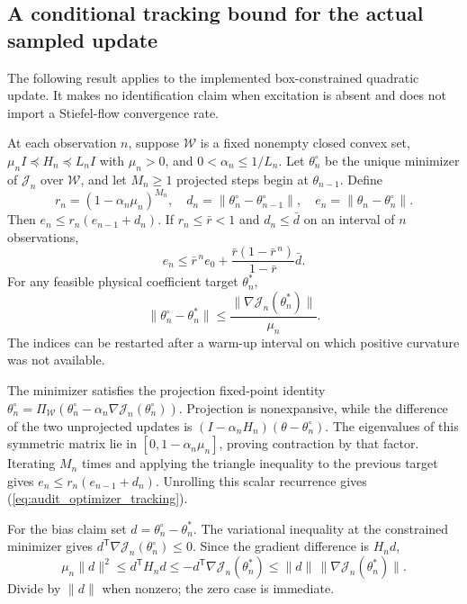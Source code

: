 \subsection{A conditional tracking bound for the actual sampled update}
The following result applies to the implemented box-constrained quadratic
update. It makes no identification claim when excitation is absent and
does not import a Stiefel-flow convergence rate.

\begin{auditproposition}
\label{prop:audit_tracking}
At each observation $n$, suppose $\mathcal W$ is a fixed nonempty closed
convex set, $\mu_n I\preceq H_n\preceq L_nI$ with $\mu_n>0$, and
$0<\alpha_n\le1/L_n$. Let $\theta_n^\circ$ be the unique minimizer
of $\mathcal J_n$ over $\mathcal W$, and let $M_n\ge1$ projected steps begin
at $\theta_{n-1}$. Define
\begin{equation}
 r_n=(1-\alpha_n\mu_n)^{M_n},\quad
 d_n=\|\theta_n^\circ-\theta_{n-1}^\circ\|,\quad
 e_n=\|\theta_n-\theta_n^\circ\|.
\end{equation}
Then $e_n\le r_n(e_{n-1}+d_n)$. If $r_n\le\bar r<1$ and
$d_n\le\bar d$ on an interval of $n$ observations,
\begin{equation}
 e_n\le\bar r^{\,n}e_0+
       \frac{\bar r(1-\bar r^{\,n})}{1-\bar r}\bar d.
 \label{eq:audit_optimizer_tracking}
\end{equation}
For any feasible physical coefficient target $\theta_n^*$,
\begin{equation}
 \|\theta_n^\circ-\theta_n^*\|
 \le\frac{\|\nabla\mathcal J_n(\theta_n^*)\|}{\mu_n}.
 \label{eq:audit_physical_bias}
\end{equation}
The indices can be restarted after a warm-up interval on which positive
curvature was not available.
\end{auditproposition}
\begin{IEEEproof}
The minimizer satisfies the projection fixed-point identity
$\theta_n^\circ=\Pi_{\mathcal W}(\theta_n^\circ-
\alpha_n\nabla\mathcal J_n(\theta_n^\circ))$.
Projection is nonexpansive, while the difference of the two unprojected
updates is $(I-\alpha_nH_n)(\theta-\theta_n^\circ)$.
The eigenvalues of this symmetric matrix lie in
$[0,1-\alpha_n\mu_n]$, proving contraction by that factor. Iterating
$M_n$ times and applying the triangle inequality to the previous target
gives $e_n\le r_n(e_{n-1}+d_n)$. Unrolling this scalar recurrence
gives (\ref{eq:audit_optimizer_tracking}).

For the bias claim set $d=\theta_n^\circ-\theta_n^*$.
The variational inequality at the constrained minimizer gives
$d^{\mathsf T}\nabla\mathcal J_n(\theta_n^\circ)\le0$.
Since the gradient difference is $H_nd$,
\begin{equation*}
 \mu_n\|d\|^2\le d^{\mathsf T}H_nd
 \le-d^{\mathsf T}\nabla\mathcal J_n(\theta_n^*)
 \le\|d\|\,\|\nabla\mathcal J_n(\theta_n^*)\|.
\end{equation*}
Divide by $\|d\|$ when nonzero; the zero case is immediate.
\end{IEEEproof}
